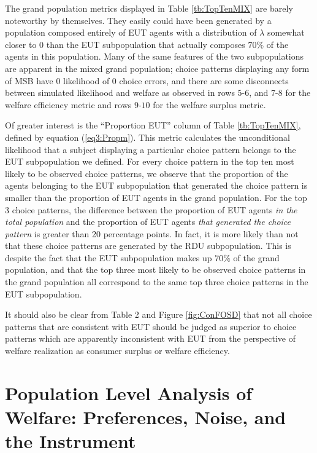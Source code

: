 \documentclass[../main.tex]{subfiles}
\begin{document}
The grand population metrics displayed in Table \ref{tb:TopTenMIX} are barely noteworthy by themselves.
They easily could have been generated by a population composed entirely of EUT agents with a distribution of $\lambda$ somewhat closer to $0$ than the EUT subpopulation that actually composes $70\%$ of the agents in this population.
Many of the same features of the two subpopulations are apparent in the mixed grand population;
choice patterns displaying any form of MSB have $0$ likelihood of $0$ choice errors, and there are some disconnects between simulated likelihood and welfare as observed in rows $5$-$6$, and $7$-$8$ for the welfare efficiency metric and rows $9$-$10$ for the welfare surplus metric.

Of greater interest is the \enquote{Proportion EUT} column of Table \ref{tb:TopTenMIX}, defined by equation (\ref{eq3:Propm}).
This metric calculates the unconditional likelihood that a subject displaying a particular choice pattern belongs to the EUT subpopulation we defined.
For every choice pattern in the top ten most likely to be observed choice patterns, we observe that the proportion of the agents belonging to the EUT subpopulation that generated the choice pattern is smaller than the proportion of EUT agents in the grand population.
For the top 3 choice patterns, the difference between the proportion of EUT agents \textit{in the total population} and the proportion of EUT agents \textit{that generated the choice pattern} is greater than 20 percentage points.
In fact, it is more likely than not that these choice patterns are generated by the RDU subpopulation.
This is despite the fact that the EUT subpopulation makes up $70\%$ of the grand population, and that the top three most likely to be observed choice patterns in the grand population all correspond to the same top three choice patterns in the EUT subpopulation.

It should also be clear from Table 2 and Figure \ref{fig:ConFOSD} that not all choice patterns that are consistent with EUT should be judged as superior to choice patterns which are apparently inconsistent with EUT from the perspective of welfare realization as consumer surplus or welfare efficiency.

\singlespacing
\section{Population Level Analysis of Welfare: Preferences, Noise, and the Instrument}
\doublespacing
\end{document}
